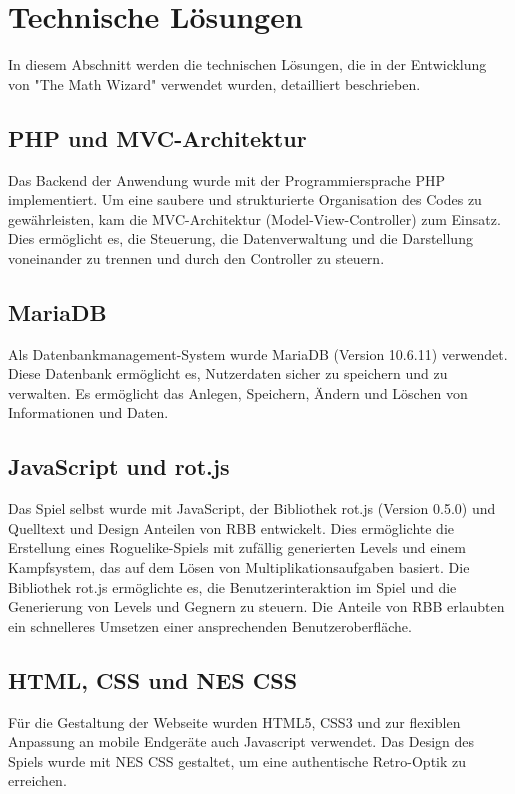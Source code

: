 \documentclass[fontsize:11pt]{article}
\begin{document}
\section{Technische Lösungen}
    In diesem Abschnitt werden die technischen Lösungen, die in der Entwicklung von "The Math Wizard" verwendet wurden, detailliert beschrieben.

    \subsection{PHP und MVC-Architektur}
        Das Backend der Anwendung wurde mit der Programmiersprache PHP implementiert. Um eine saubere und strukturierte Organisation des Codes zu gewährleisten, kam die MVC-Architektur (Model-View-Controller) zum Einsatz. Dies ermöglicht es, die Steuerung, die Datenverwaltung und die Darstellung voneinander zu trennen und durch den Controller zu steuern.

    \subsection{MariaDB}
        Als Datenbankmanagement-System wurde MariaDB (Version 10.6.11) verwendet. Diese Datenbank ermöglicht es, Nutzerdaten sicher zu speichern und zu verwalten. Es ermöglicht das Anlegen, Speichern, Ändern und Löschen von Informationen und Daten.

    \subsection{JavaScript und rot.js}
        Das Spiel selbst wurde mit JavaScript, der Bibliothek rot.js (Version 0.5.0) und Quelltext und Design Anteilen von RBB entwickelt. Dies ermöglichte die Erstellung eines Roguelike-Spiels mit zufällig generierten Levels und einem Kampfsystem, das auf dem Lösen von Multiplikationsaufgaben basiert. Die Bibliothek rot.js ermöglichte es, die Benutzerinteraktion im Spiel und die Generierung von Levels und Gegnern zu steuern. Die Anteile von RBB erlaubten ein schnelleres Umsetzen einer ansprechenden Benutzeroberfläche.

    \subsection{HTML, CSS und NES CSS}
        Für die Gestaltung der Webseite wurden HTML5, CSS3 und zur flexiblen Anpassung an mobile Endgeräte auch Javascript verwendet. Das Design des Spiels wurde mit NES CSS gestaltet, um eine authentische Retro-Optik zu erreichen.
\end{document}
